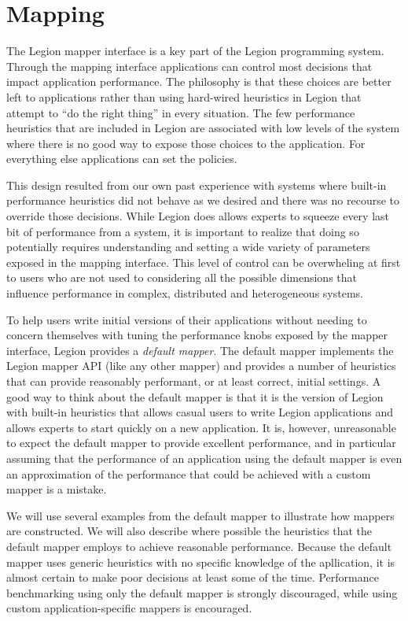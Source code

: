 \chapter{Mapping}
\label{chap:mapping}
The Legion mapper interface is a key part
of the Legion programming system. Through the mapping interface applications
can control most decisions that impact application performance.
The philosophy is that these choices are better left to applications
rather than using hard-wired heuristics in Legion that attempt to ``do the right thing'' in
every situation.  The few performance heuristics
that are included in Legion are associated with low levels of the system
where there is no good way to expose those choices to the application.
For everything else applications can set the policies.

This design resulted from our own past experience with systems
where built-in performance heuristics did not behave as we desired and there was no recourse
to override those decisions.  While Legion does allows
experts to squeeze every last bit of performance from a system, it is important
to realize that doing so potentially requires understanding and setting a wide
variety of parameters exposed in the mapping interface.
This level of control can be overwheling at first to users who are not used to
considering all the possible dimensions that influence performance in complex,
distributed and heterogeneous systems.

To help users write initial versions of their applications without needing
to concern themselves with tuning the performance knobs exposed by the mapper
interface, Legion provides a {\em default mapper}.  The default mapper
implements the Legion mapper API (like any other mapper) and provides a number
of heuristics that can provide reasonably performant, or at least correct, initial
settings.  A good way to think about the default mapper is that it is the version
of Legion with built-in heuristics that allows casual users to write Legion
applications and allows experts to start quickly on a new application.
It is, however, unreasonable to expect the default mapper to provide excellent performance, and in
particular assuming that the performance of an application using the default
mapper is even an approximation of the performance that could be
achieved with a custom mapper is a mistake.


We will use several examples from the default mapper
to illustrate how mappers are constructed. We will also describe where
possible the heuristics that the default mapper employs to achieve
reasonable performance. Because the default mapper uses generic heuristics
with no specific knowledge of the apllication, it is almost certain to make
poor decisions at least some of the time.
Performance benchmarking using only the default mapper is strongly
discouraged, while using custom application-specific mappers is
encouraged.

